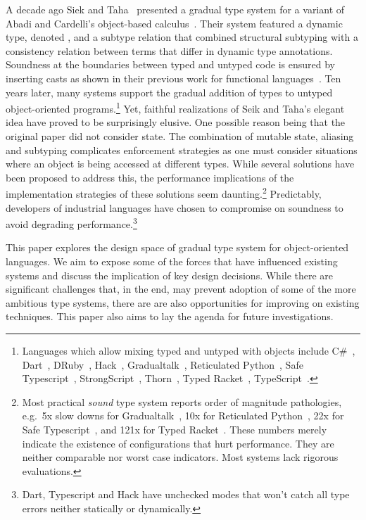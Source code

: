 \documentclass[a4paper,USenglish]{tex/lipics-v2016}
\begin{document}
\noindent
A decade ago Siek and Taha~\cite{SiekTaha07} presented a gradual type system
for a variant of Abadi and Cardelli's object-based
calculus~\cite{cardelli:1996:theory-of-objects}. Their system featured a
dynamic type, denoted \any, and a subtype relation that combined structural
subtyping with a consistency relation between terms that differ in dynamic
type annotations.  Soundness at the boundaries between typed and untyped
code is ensured by inserting casts as shown in their previous work for
functional languages~\cite{SiekTaha06}.  Ten years later, many systems
support the gradual addition of types to untyped object-oriented
programs.\footnote{Languages which allow mixing typed and untyped with
  objects include
C\#~\cite{Bierman10},
Dart~\cite{dart13}, 
DRuby~\cite{FurrAF2009},
Hack~\cite{hack13}, 
Gradualtalk~\cite{GS13},
Reticulated Python~\cite{siek14}, 
Safe Typescript~\cite{safe-typescript},
StrongScript~\cite{ecoop15}, 
Thorn~\cite{oopsla09}, 
Typed Racket~\cite{Takikawa:2012}, 
TypeScript~\cite{BAT14}.}
Yet, faithful realizations of Seik and Taha's elegant idea have proved to be
surprisingly elusive.  One possible reason being that the original paper did
not consider state.  The combination of mutable state, aliasing and
subtyping complicates enforcement strategies as one must consider situations
where an object is being accessed at different types. While several
solutions have been proposed to address this, the performance implications
of the implementation strategies of these solutions seem
daunting.\footnote{Most practical \emph{sound} type system reports order of
  magnitude pathologies, e.g.~5x slow downs for
  Gradualtalk~\cite{allende13}, 10x for Reticulated Python~\cite{siek14},
  22x for Safe Typescript~\cite{safe-typescript}, and 121x for Typed
  Racket~\cite{popl16}. These numbers merely indicate the existence of
  configurations that hurt performance.  They are neither comparable nor
  worst case indicators.  Most systems lack rigorous evaluations.  }
Predictably, developers of industrial languages have chosen to compromise on
soundness to avoid degrading performance.\footnote{ Dart, Typescript and
  Hack have unchecked modes that won't catch all type errors neither statically
or dynamically.}

This paper explores the design space of gradual type system for
object-oriented languages. We aim to expose some of the forces that have
influenced existing systems and discuss the implication of key design
decisions. While there are significant challenges that, in the end, may
prevent adoption of some of the more ambitious type systems, there are are
also opportunities for improving on existing techniques.  This paper also
aims to lay the agenda for future investigations.
\end{document}
